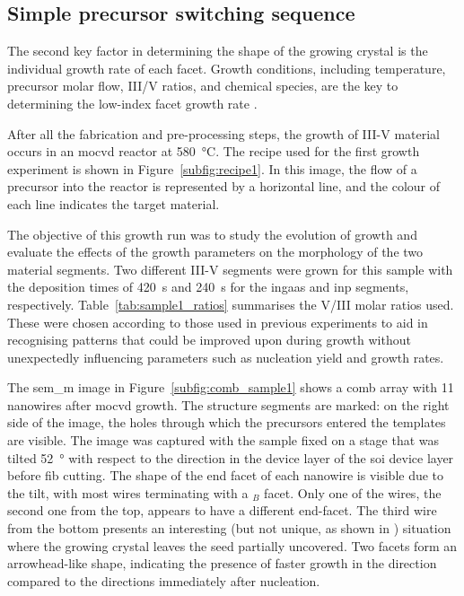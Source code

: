 \subsection{Simple precursor switching sequence}

The second key factor in determining the shape of the growing crystal is the individual growth rate of each facet. Growth conditions, including temperature, precursor molar flow, III/V ratios, and chemical species, are the key to determining the low-index facet growth rate \cite{Borg2015, Elsner1992}.

After all the fabrication and pre-processing steps, the growth of III-V material occurs in an \acf{mocvd} reactor at \qty{580}{\degreeCelsius}. The recipe used for the first growth experiment is shown in Figure~\ref{subfig:recipe1}. In this image, the flow of a precursor into the reactor is represented by a horizontal line, and the colour of each line indicates the target material.

The objective of this growth run was to study the evolution of growth and evaluate the effects of the growth parameters on the morphology of the two material segments. Two different III-V segments were grown for this sample with the deposition times of \qty{420}{\second} and \qty{240}{\second} for the \acs{ingaas} and \acs{inp} segments, respectively. Table~\ref{tab:sample1_ratios} summarises the V/III molar ratios used. These were chosen according to those used in previous experiments to aid in recognising patterns that could be improved upon during growth without unexpectedly influencing parameters such as nucleation yield and growth rates.

The \acs{sem_m} image in Figure~\ref{subfig:comb_sample1} shows a comb array with \num{11} nanowires after \acs{mocvd} growth. The structure segments are marked: on the right side of the image, the holes through which the precursors entered the templates are visible. The image was captured with the sample fixed on a stage that was tilted \qty{52}{\degree} with respect to the  direction in the device layer of the \acs{soi} device layer before \acs{fib} cutting. The shape of the end facet of each nanowire is visible due to the tilt, with most wires terminating with a \(_B\) facet. Only one of the wires, the second one from the top, appears to have a different end-facet. The third wire from the bottom presents an interesting (but not unique, as shown in \cite{Scherrer2022}) situation where the growing crystal leaves the seed partially uncovered. Two  facets form an arrowhead-like shape, indicating the presence of faster growth in the  direction compared to the  directions immediately after nucleation.

